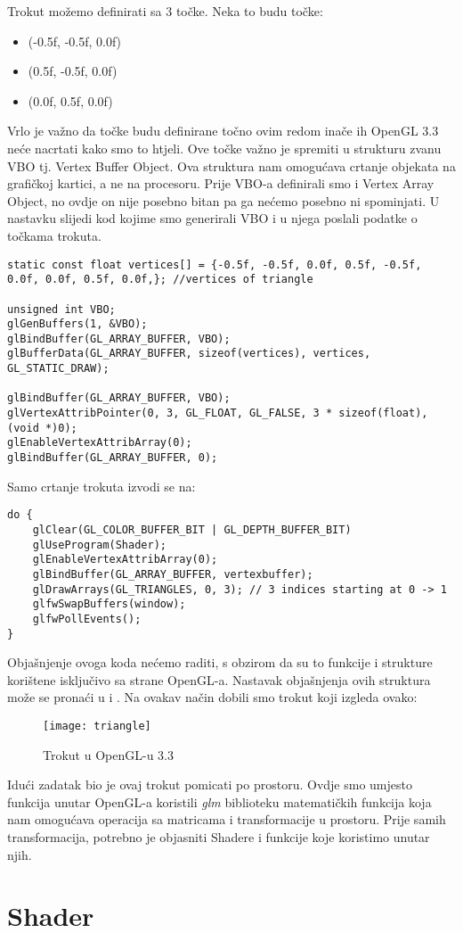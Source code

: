 Trokut možemo definirati sa 3 točke. Neka to budu točke:
\begin{itemize}
	\item (-0.5f, -0.5f, 0.0f)
	\item (0.5f, -0.5f, 0.0f)
	\item (0.0f, 0.5f, 0.0f)
\end{itemize}
Vrlo je važno da točke budu definirane točno ovim redom inače ih OpenGL 3.3 neće nacrtati kako smo to htjeli. Ove točke važno je spremiti u strukturu zvanu VBO tj. Vertex Buffer Object. Ova struktura nam omogućava crtanje objekata na grafičkoj kartici, a ne na procesoru\cite{16}. Prije VBO-a definirali smo i Vertex Array Object, no ovdje on nije posebno bitan pa ga nećemo posebno ni spominjati. U nastavku slijedi kod kojime smo generirali VBO i u njega poslali podatke o točkama trokuta\cite{15}.\newpage
\begin{lstlisting}[style = myC++, label = {code:15}, caption = {Generiranje VBO\cite{16}}]
static const float vertices[] = {-0.5f, -0.5f, 0.0f, 0.5f, -0.5f, 0.0f, 0.0f, 0.5f, 0.0f,}; //vertices of triangle
	  
unsigned int VBO;
glGenBuffers(1, &VBO);
glBindBuffer(GL_ARRAY_BUFFER, VBO);
glBufferData(GL_ARRAY_BUFFER, sizeof(vertices), vertices, GL_STATIC_DRAW);
	  
glBindBuffer(GL_ARRAY_BUFFER, VBO);
glVertexAttribPointer(0, 3, GL_FLOAT, GL_FALSE, 3 * sizeof(float), (void *)0);
glEnableVertexAttribArray(0);
glBindBuffer(GL_ARRAY_BUFFER, 0);
\end{lstlisting}
Samo crtanje trokuta izvodi se na:
\begin{lstlisting}[style = myC++, label = {code:16}, caption = {Crtanje trokuta\cite{15}}]
do {
	glClear(GL_COLOR_BUFFER_BIT | GL_DEPTH_BUFFER_BIT)
	glUseProgram(Shader);
	glEnableVertexAttribArray(0);
	glBindBuffer(GL_ARRAY_BUFFER, vertexbuffer);
	glDrawArrays(GL_TRIANGLES, 0, 3); // 3 indices starting at 0 -> 1
	glfwSwapBuffers(window);
	glfwPollEvents();
}
\end{lstlisting}

Objašnjenje ovoga koda nećemo raditi, s obzirom da su to funkcije i strukture korištene isključivo sa strane OpenGL-a. Nastavak objašnjenja ovih struktura može se pronaći u \cite{15} i \cite{16}. Na ovakav način dobili smo trokut koji izgleda ovako:\newpage
\begin{figure}[!http]
	\begin{center}
		\texttt{[image: triangle]}
		\caption{Trokut u OpenGL-u 3.3}
		\label{fig:29}
		\end{center}
\end{figure}

Idući zadatak bio je ovaj trokut pomicati po prostoru. Ovdje smo umjesto funkcija unutar OpenGL-a koristili \emph{glm} biblioteku matematičkih funkcija koja nam omogućava operacija sa matricama i transformacije u prostoru. Prije samih transformacija, potrebno je objasniti Shadere i funkcije koje koristimo unutar njih.

\section{Shader}

